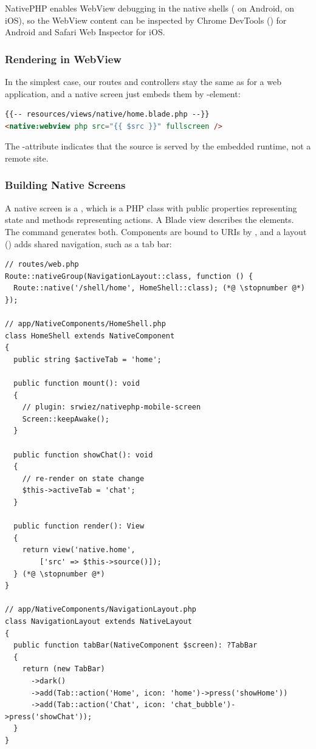 \noindent NativePHP enables WebView debugging in the native shells
( on Android,  on iOS), so the WebView
content can be inspected by Chrome DevTools () for Android and Safari Web
Inspector for iOS.


\subsubsection{Rendering in WebView}

In the simplest case, our routes and controllers stay the same as for a web application, and a
native screen just embeds them by -element:

\begin{lstlisting}[language=HTML]
{{-- resources/views/native/home.blade.php --}}
<native:webview php src="{{ $src }}" fullscreen />
\end{lstlisting}

\noindent The -attribute indicates that the source is served by the embedded runtime, not
a remote site.


\subsubsection{Building Native Screens}

A native screen is a , which is a PHP class with public properties
representing state and methods representing actions. A Blade view describes the elements. The
command  generates both. Components are bound to URIs by
, and a layout () adds shared navigation, such as a tab bar:

\begin{lstlisting}
// routes/web.php
Route::nativeGroup(NavigationLayout::class, function () {
  Route::native('/shell/home', HomeShell::class); (*@ \stopnumber @*)
});

// app/NativeComponents/HomeShell.php
class HomeShell extends NativeComponent
{
  public string $activeTab = 'home';

  public function mount(): void
  {
    // plugin: srwiez/nativephp-mobile-screen
    Screen::keepAwake();
  }

  public function showChat(): void
  {
    // re-render on state change
    $this->activeTab = 'chat';
  }

  public function render(): View
  {
    return view('native.home',
        ['src' => $this->source()]);
  } (*@ \stopnumber @*)
}

// app/NativeComponents/NavigationLayout.php
class NavigationLayout extends NativeLayout
{
  public function tabBar(NativeComponent $screen): ?TabBar
  {
    return (new TabBar)
      ->dark()
      ->add(Tab::action('Home', icon: 'home')->press('showHome'))
      ->add(Tab::action('Chat', icon: 'chat_bubble')->press('showChat'));
  }
}
\end{lstlisting}

